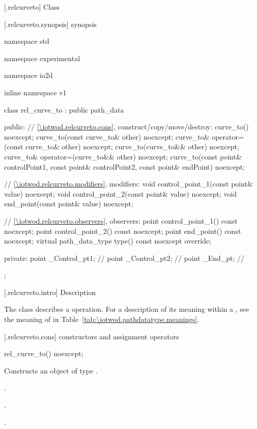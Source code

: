  [\iotwod.relcurveto] {Class }

 [\iotwod.relcurveto.synopsis] { synopsis}

\begin{codeblock}
namespace std { namespace experimental { namespace io2d { inline namespace v1 {
  class rel_curve_to : public path_data {
  public:
    // \ref{\iotwod.relcurveto.cons}, construct/copy/move/destroy:
    curve_to() noexcept;
    curve_to(const curve_to& other) noexcept;
    curve_to& operator=(const curve_to& other) noexcept;
    curve_to(curve_to&& other) noexcept;
    curve_to& operator=(curve_to&& other) noexcept;
    curve_to(const point& controlPoint1, const point& controlPoint2,
      const point& endPoint) noexcept;

    // \ref{\iotwod.relcurveto.modifiers}, modifiers:
    void control_point_1(const point& value) noexcept;
    void control_point_2(const point& value) noexcept;
    void end_point(const point& value) noexcept;


    // \ref{\iotwod.relcurveto.observers}, observers:
    point control_point_1() const noexcept;
    point control_point_2() const noexcept;
    point end_point() const noexcept;
    virtual path_data_type type() const noexcept override;
    
  private:
    point _Control_pt1; // \expos
    point _Control_pt2; // \expos
    point _End_pt;      // \expos
  };
} } } }
\end{codeblock}

 [\iotwod.relcurveto.intro] { Description}

\pnum
{}
The class  describes a  operation. For a description of its meaning within a , see the meaning of  in Table~\ref{tab:\iotwod.pathdatatype.meanings}.

 [\iotwod.relcurveto.cons] { constructors and assignment operators}

\begin{itemdecl}
    rel_curve_to() noexcept;
\end{itemdecl}
\begin{itemdescr}
	\pnum
	\effects
	Constructs an object of type .
	
	\pnum
	\postconditions
	.

	.

	.

\end{itemdescr}

